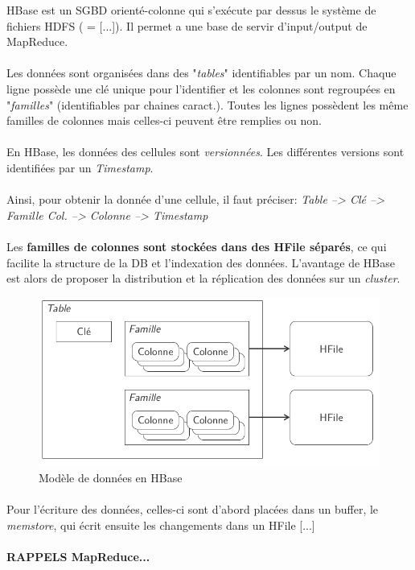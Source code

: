 \item{}
{\vrai}
{
HBase est un SGBD orienté-colonne qui s'exécute par dessus le système de fichiers HDFS ( = [...]). Il permet a une base de servir d'input/output de MapReduce.
\paragraph{}
Les données sont organisées dans des "\textit{tables}" identifiables par un nom. Chaque ligne possède une clé unique pour l'identifier et les colonnes sont regroupées en "\textit{familles}" (identifiables par chaines caract.). Toutes les lignes possèdent les même familles de colonnes mais celles-ci peuvent être remplies ou non.
\paragraph{}
En HBase, les données des cellules sont \textit{versionnées}. Les différentes versions sont identifiées par un \textit{Timestamp}.
\paragraph{}
Ainsi, pour obtenir la donnée d'une cellule, il faut préciser: \textit{Table --> Clé --> Famille Col. --> Colonne --> Timestamp}
\paragraph{}
Les \textbf{familles de colonnes sont stockées dans des HFile séparés}, ce qui facilite la structure de la DB et l'indexation des données. L'avantage de HBase est alors de proposer la distribution et la réplication des données sur un \textit{cluster}.
\begin{figure}[h!]
\center\includegraphics[scale=.3]{images/hbase}
\caption{Modèle de données en HBase \cite{ref1}}
\end{figure}

\paragraph{}
Pour l'écriture des données, celles-ci sont d'abord placées dans un buffer, le \textit{memstore}, qui écrit ensuite les changements dans un HFile [...]
\paragraph{RAPPELS MapReduce...}
}



